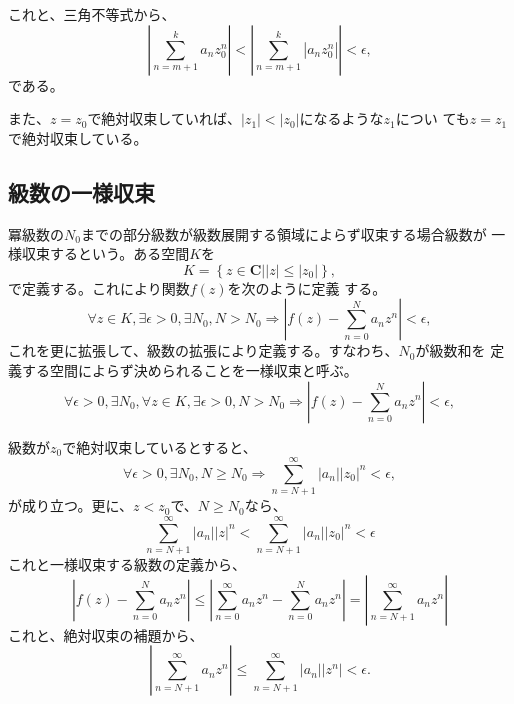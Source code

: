 これと、三角不等式から、
\begin{equation}
 \left|\sum_{n=m+1}^{k} a_nz_0^n\right| 
  < \left|\sum_{n=m+1}^{k} \left|a_nz_0^n\right|\right|
  <\epsilon,
\end{equation}
である。

また、$z=z_0$で絶対収束していれば、$|z_1|<|z_0|$になるような$z_1$につい
ても$z=z_1$で絶対収束している。

\subsection{級数の一様収束}
冪級数の$N_0$までの部分級数が級数展開する領域によらず収束する場合級数が
一様収束するという。ある空間$K$を
\begin{equation}
 K=\left\{z\in\mathbf{C}\left|\right.|z|\leq |z_0|\right\},
\end{equation}
で定義する。これにより関数$f(z)$を次のように定義
する。
\begin{equation}
 \forall z\in K, \exists\epsilon>0, \exists N_0, N>N_0
  \Rightarrow 
  \left|f(z)-\sum_{n=0}^Na_nz^n\right| < \epsilon,
\end{equation}
これを更に拡張して、級数の拡張により定義する。すなわち、$N_0$が級数和を
定義する空間によらず決められることを一様収束と呼ぶ。
\begin{equation}
  \forall\epsilon > 0, \exists N_0, \forall z\in K, \exists\epsilon>0, N>N_0
  \Rightarrow 
  \left|f(z)-\sum_{n=0}^Na_nz^n\right| < \epsilon,
\end{equation}

級数が$z_0$で絶対収束しているとすると、
\begin{equation}
 \forall\epsilon>0, \exists N_0, N \geq N_0
  \Rightarrow
  \sum_{n=N+1}^{\infty}\left|a_n\right|\left|z_0\right|^n < \epsilon,
\end{equation}
が成り立つ。更に、$z<z_0$で、$N\geq N_0$なら、
\begin{equation}
 \sum_{n=N+1}^{\infty}\left|a_n\right|\left|z\right|^n
  < \sum_{n=N+1}^{\infty}\left|a_n\right|\left|z_0\right|^n
  < \epsilon
\end{equation}
これと一様収束する級数の定義から、
\begin{equation}
 \left|f(z) - \sum_{n=0}^N a_nz^n\right| 
  \leq \left|\sum_{n=0}^{\infty} a_nz^n - \sum_{n=0}^N a_nz^n\right|
  = \left|\sum_{n=N+1}^{\infty} a_nz^n\right|
\end{equation}
これと、絶対収束の補題から、
\begin{equation}
 \left|\sum_{n=N+1}^{\infty} a_nz^n\right|
  \leq \sum_{n=N+1}^{\infty} \left|a_n\right|\left|z^n\right| < \epsilon.
\end{equation}


